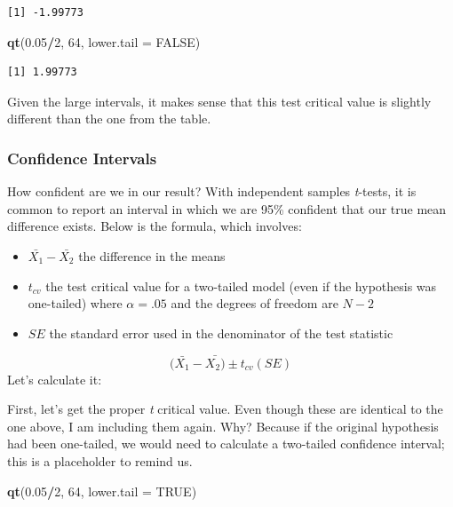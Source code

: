 \documentclass[
  11pt,
]{book}
\newenvironment{Shaded}{\begin{snugshade}}{\end{snugshade}}
\newcommand{\AttributeTok}[1]{\textcolor[rgb]{0.27,0.27,0.27}{#1}}
\newcommand{\ConstantTok}[1]{\textcolor[rgb]{0.37,0.37,0.37}{#1}}
\newcommand{\DecValTok}[1]{\textcolor[rgb]{0.06,0.06,0.06}{#1}}
\newcommand{\FloatTok}[1]{\textcolor[rgb]{0.06,0.06,0.06}{#1}}
\newcommand{\FunctionTok}[1]{\textcolor[rgb]{0.27,0.27,0.27}{\textbf{#1}}}
\newcommand{\NormalTok}[1]{#1}
\newcommand{\SpecialCharTok}[1]{\textcolor[rgb]{0.43,0.43,0.43}{\textbf{#1}}}
\providecommand{\tightlist}{%
  \setlength{\itemsep}{0pt}\setlength{\parskip}{0pt}}
\begin{document}
\begin{verbatim}
[1] -1.99773
\end{verbatim}

\begin{Shaded}
\begin{Highlighting}[]
\FunctionTok{qt}\NormalTok{(}\FloatTok{0.05}\SpecialCharTok{/}\DecValTok{2}\NormalTok{, }\DecValTok{64}\NormalTok{, }\AttributeTok{lower.tail =} \ConstantTok{FALSE}\NormalTok{)}
\end{Highlighting}
\end{Shaded}

\begin{verbatim}
[1] 1.99773
\end{verbatim}

Given the large intervals, it makes sense that this test critical value is slightly different than the one from the table.

\hypertarget{confidence-intervals-1}{%
\subsubsection{Confidence Intervals}\label{confidence-intervals-1}}

How confident are we in our result? With independent samples \emph{t}-tests, it is common to report an interval in which we are 95\% confident that our true mean difference exists. Below is the formula, which involves:

\begin{itemize}
\tightlist
\item
  \(\bar{X_{1}}-\bar{X_{2}}\) the difference in the means
\item
  \(t_{cv}\) the test critical value for a two-tailed model (even if the hypothesis was one-tailed) where \(\alpha = .05\) and the degrees of freedom are \(N-2\)
\item
  \(SE\) the standard error used in the denominator of the test statistic
\end{itemize}

\[(\bar{X_{1}} -\bar{X_{2})} \pm  t_{cv}(SE)\] Let's calculate it:

First, let's get the proper \emph{t} critical value. Even though these are identical to the one above, I am including them again. Why? Because if the original hypothesis had been one-tailed, we would need to calculate a two-tailed confidence interval; this is a placeholder to remind us.

\begin{Shaded}
\begin{Highlighting}[]
\FunctionTok{qt}\NormalTok{(}\FloatTok{0.05}\SpecialCharTok{/}\DecValTok{2}\NormalTok{, }\DecValTok{64}\NormalTok{, }\AttributeTok{lower.tail =} \ConstantTok{TRUE}\NormalTok{)}
\end{Highlighting}
\end{Shaded}
\end{document}

